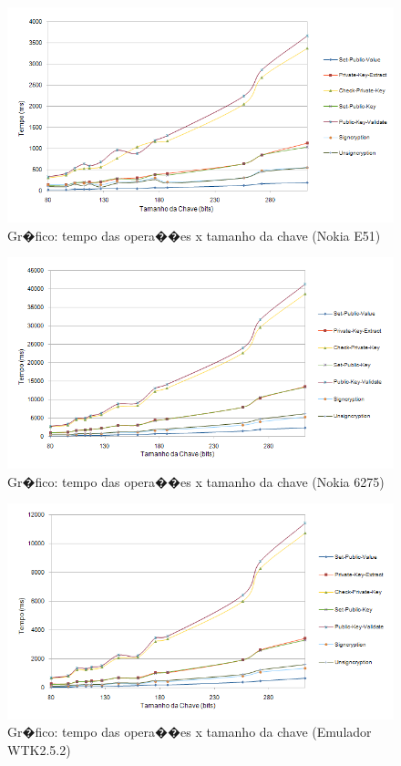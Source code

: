 \documentclass[a4paper,capchap,espacoduplo,normaltoc]{abntepusp}
\begin{document}
\begin{figure}
	\centering
		\includegraphics{figuras/teste_nokiae51.PNG}
	\caption{Gr�fico: tempo das opera��es x tamanho da chave (Nokia E51)}
	\label{fig:teste_nokiae51}
\end{figure}

\begin{figure}
	\centering
		\includegraphics{figuras/teste_nokia6275.PNG}
	\caption{Gr�fico: tempo das opera��es x tamanho da chave (Nokia 6275)}
	\label{fig:teste_nokia6275}
\end{figure}

\begin{figure}
	\centering
		\includegraphics{figuras/teste_emulador.PNG}
	\caption{Gr�fico: tempo das opera��es x tamanho da chave (Emulador WTK2.5.2)}	\label{fig:teste_emulador}
\end{figure}
\end{document}

